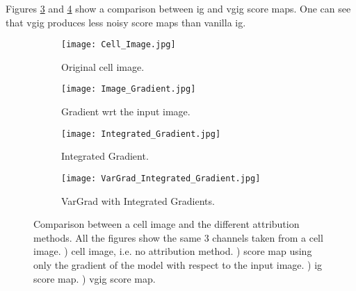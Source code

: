 Figures \ref{fig:vg:img_IG} and \ref{fig:vg:img_VG_IG} show a comparison between \gls{ig} and \gls{vgig} score maps. One can see that \gls{vgig} produces less noisy score maps than vanilla \gls{ig}.

\begin{figure}[htb]
  \centering
  \begin{subfigure}[b]{.45\linewidth}
    \texttt{[image: Cell\_Image.jpg]}
    \caption{Original cell image.}
    \label{fig:vg:cell_img}
  \end{subfigure}
  \begin{subfigure}[b]{.45\linewidth}
    \texttt{[image: Image\_Gradient.jpg]}
    \caption{Gradient wrt the input image.}
    \label{fig:vg:img_gradients}
  \end{subfigure}%
  \vspace{3mm}
  \begin{subfigure}[b]{.45\linewidth}
    \texttt{[image: Integrated\_Gradient.jpg]}
    \caption{Integrated Gradient.}
    \label{fig:vg:img_IG}
  \end{subfigure}
  \begin{subfigure}[b]{.45\linewidth}
    \texttt{[image: VarGrad\_Integrated\_Gradient.jpg]}
    \caption{VarGrad with Integrated Gradients.}
    \label{fig:vg:img_VG_IG}
  \end{subfigure}
  \caption{Comparison between a cell image and the different attribution methods. All the figures show the same 3 channels taken from a cell image. ) cell image, i.e. no attribution method. ) score map using only the gradient of the model with respect to the input image. ) \acrlong{ig} score map. ) \acrlong{vgig} score map.}
  \label{fig:vg:comparative}
\end{figure}
